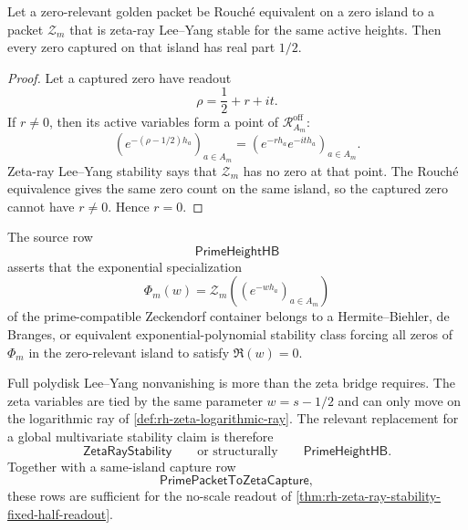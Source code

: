 \begin{theorem}
\label{thm:rh-zeta-ray-stability-fixed-half-readout}
Let a zero-relevant golden packet be Rouch\'e equivalent on a zero
island to a packet $\mathcal Z_m$ that is zeta-ray Lee--Yang stable for
the same active heights.  Then every zero captured on that island has
real part $1/2$.
\end{theorem}

\begin{proof}
Let a captured zero have readout
$$
\rho=\frac12+r+it.
$$
If $r\ne0$, then its active variables form a point of
$\mathcal R_{A_m}^{\mathrm{off}}$:
$$
\left(e^{-(\rho-1/2)h_a}\right)_{a\in A_m}
=
\left(e^{-rh_a}e^{-ith_a}\right)_{a\in A_m}.
$$
Zeta-ray Lee--Yang stability says that $\mathcal Z_m$ has no zero at
that point.  The Rouch\'e equivalence gives the same zero count on the
same island, so the captured zero cannot have $r\ne0$.  Hence $r=0$.
\end{proof}

\begin{definition}
\label{def:rh-prime-height-hb-row}
The source row
$$
\mathsf{PrimeHeightHB}
$$
asserts that the exponential specialization
$$
\Phi_m(w)=
\mathcal Z_m\left((e^{-w h_a})_{a\in A_m}\right)
$$
of the prime-compatible Zeckendorf container belongs to a
Hermite--Biehler, de Branges, or equivalent exponential-polynomial
stability class forcing all zeros of $\Phi_m$ in the zero-relevant
island to satisfy $\Re(w)=0$.
\end{definition}

\begin{principle}
\label{prin:rh-ray-stability-container-surface}
Full polydisk Lee--Yang nonvanishing is more than the zeta bridge
requires.  The zeta variables are tied by the same parameter
$w=s-1/2$ and can only move on the logarithmic ray of
\autoref{def:rh-zeta-logarithmic-ray}.  The relevant replacement for a
global multivariate stability claim is therefore
$$
\mathsf{ZetaRayStability}
\qquad
\text{or structurally}
\qquad
\mathsf{PrimeHeightHB}.
$$
Together with a same-island capture row
$$
\mathsf{PrimePacketToZetaCapture},
$$
these rows are sufficient for the no-scale readout of
\autoref{thm:rh-zeta-ray-stability-fixed-half-readout}.
\end{principle}

